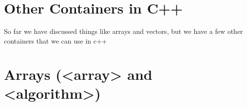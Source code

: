 \documentclass{report}
\begin{document}
    \pagebreak \bigbreak \noindent 
    \section{\LARGE Other Containers in C++ }
    \bigbreak \noindent 
    So far we have discussed things like arrays and vectors, but we have a few other containers that we can use in c++
    \bigbreak \noindent 
    \subsection{}


    \pagebreak \bigbreak \noindent 
    \section{\LARGE Arrays (<array> and <algorithm>) }
    \bigbreak \noindent 
\end{document}
